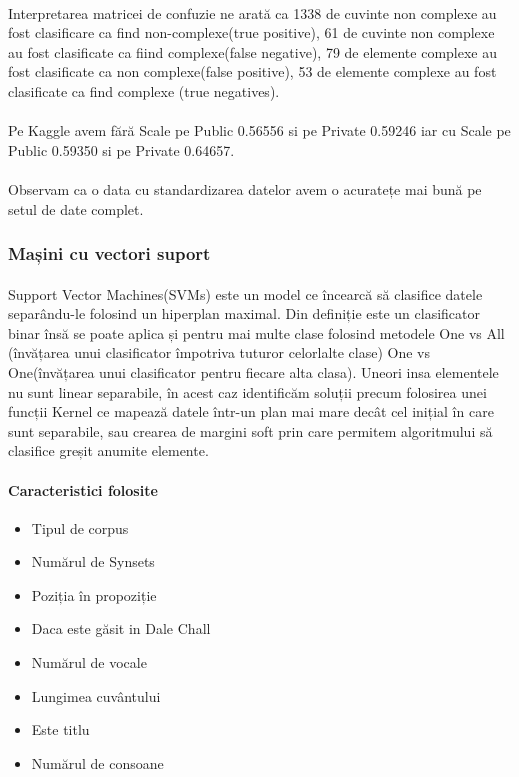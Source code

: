 \documentclass{article}
\begin{document}
\paragraph{}Interpretarea matricei de confuzie ne arată ca 1338 de cuvinte non complexe au fost clasificare ca find non-complexe(true positive), 61 de cuvinte non complexe au fost clasificate ca fiind complexe(false negative),
79 de elemente complexe au fost clasificate ca non complexe(false positive), 53 de elemente complexe au fost clasificate ca find complexe (true negatives).
\paragraph{} Pe Kaggle avem fără Scale pe Public 0.56556 si pe Private 0.59246 iar cu Scale pe Public 0.59350 si pe Private 0.64657.
\paragraph{} Observam ca o data cu standardizarea datelor avem o acuratețe mai bună pe setul de date complet.
 
 
 
 
\subsubsection{Mașini cu vectori suport}
\paragraph{} Support Vector Machines(SVMs) este un model ce încearcă să clasifice datele separându-le folosind un hiperplan maximal. Din definiție este un clasificator binar însă se poate aplica și pentru mai multe clase folosind metodele One vs All (învățarea unui clasificator împotriva tuturor celorlalte clase) One vs One(învățarea unui clasificator pentru fiecare alta clasa). Uneori insa elementele nu sunt linear separabile, în acest caz identificăm soluții precum folosirea unei funcții Kernel ce mapează datele într-un plan mai mare decât cel inițial în care sunt separabile, sau crearea de margini soft prin care permitem algoritmului să clasifice greșit anumite elemente.
 
\paragraph{Caracteristici folosite}
\begin{itemize}
  \item Tipul de corpus
  \item Numărul de Synsets
  \item Poziția în propoziție
  \item Daca este găsit in Dale Chall
  \item Numărul de vocale
  \item Lungimea cuvântului
  \item Este titlu
  \item Numărul de consoane
\end{itemize}
 
\end{document}
